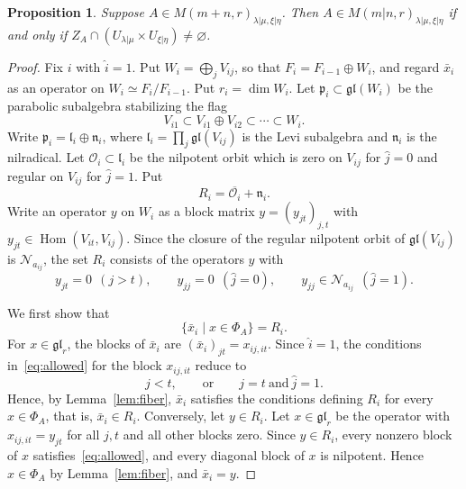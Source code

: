 \documentclass[11pt,a4paper]{amsart}
\newtheorem{proposition}[theorem]{Proposition}
\theoremstyle{definition}
\theoremstyle{remark}
\newcommand{\N}{\mathcal N}
\newcommand{\Hom}{\operatorname{Hom}}
\newcommand{\lm}{\lambda|\mu}
\newcommand{\xh}{\xi|\eta}
\newcommand{\Mat}{M(m+n,r)}
\newcommand{\Smat}{M(m|n,r)}
\numberwithin{equation}{section}
\begin{document}
\begin{proposition}\label{prop:regular-admissible}
Suppose $A\in\Mat_{\lm,\xh}$. Then
$A\in\Smat_{\lm,\xh}$ if and only if 
$Z_A\cap(U_{\lm}\times U_{\xh})\ne\varnothing$.
\end{proposition}
\begin{proof}
Fix $i$ with $\widehat i=1$. Put $W_i=\bigoplus_jV_{ij}$, so that
$F_i=F_{i-1}\oplus W_i$, and regard $\bar x_i$ as an operator on
$W_i\simeq F_i/F_{i-1}$. Put $r_i=\dim W_i$. Let
$\mathfrak p_i\subset\mathfrak{gl}(W_i)$ be the parabolic subalgebra
stabilizing the flag
$$
V_{i1}\subset V_{i1}\oplus V_{i2}\subset\cdots\subset W_i .
$$
Write $\mathfrak p_i=\mathfrak l_i\oplus\mathfrak n_i$, where
$\mathfrak l_i=\prod_j\mathfrak{gl}(V_{ij})$ is the Levi subalgebra and
$\mathfrak n_i$ is the nilradical. Let $\mathcal O_i\subset\mathfrak l_i$
be the nilpotent orbit which is zero on $V_{ij}$ for $\widehat j=0$ and
regular on $V_{ij}$ for $\widehat j=1$. Put
$$
R_i=\overline{\mathcal O_i}+\mathfrak n_i .
$$
Write an operator $y$ on $W_i$ as a block matrix $y=(y_{jt})_{j,t}$ with
$y_{jt}\in\Hom(V_{it},V_{ij})$. Since the closure of the regular
nilpotent orbit of $\mathfrak{gl}(V_{ij})$ is $\N_{a_{ij}}$, the set
$R_i$ consists of the operators $y$ with
$$
y_{jt}=0\ \ (j>t),\qquad
y_{jj}=0\ \ (\widehat j=0),\qquad
y_{jj}\in\N_{a_{ij}}\ \ (\widehat j=1).
$$

We first show that
$$
\{\bar x_i\mid x\in\Phi_A\}=R_i .
$$
For $x\in\mathfrak{gl}_r$, the blocks of $\bar x_i$ are
$(\bar x_i)_{jt}=x_{ij,it}$. Since $\widehat i=1$, the conditions
in~\eqref{eq:allowed} for the block $x_{ij,it}$ reduce to
$$
j<t,\qquad\text{or}\qquad j=t\ \text{and}\ \widehat j=1 .
$$
Hence, by Lemma~\ref{lem:fiber}, $\bar x_i$ satisfies the conditions defining
$R_i$ for every $x\in\Phi_A$, that is, $\bar x_i\in R_i$. Conversely, let
$y\in R_i$. Let $x\in\mathfrak{gl}_r$ be the operator with
$x_{ij,it}=y_{jt}$ for all $j,t$ and all other blocks zero. Since
$y\in R_i$, every nonzero block of $x$ satisfies~\eqref{eq:allowed}, and
every diagonal block of $x$ is nilpotent. Hence $x\in\Phi_A$ by
Lemma~\ref{lem:fiber}, and $\bar x_i=y$.


\end{proof}
\end{document}
